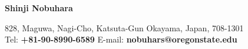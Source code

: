 \begin{center}
    \begin{large}
       \textbf{Shinji Nobuhara}\\
    \end{large}
    828, Maguwa, Nagi-Cho, Katsuta-Gun Okayama, Japan, 708-1301 \\
    Tel: \textbf{+81-90-8990-6589} \hfill E-mail: \textbf{nobuhars@oregonstate.edu} \\
\end{center}